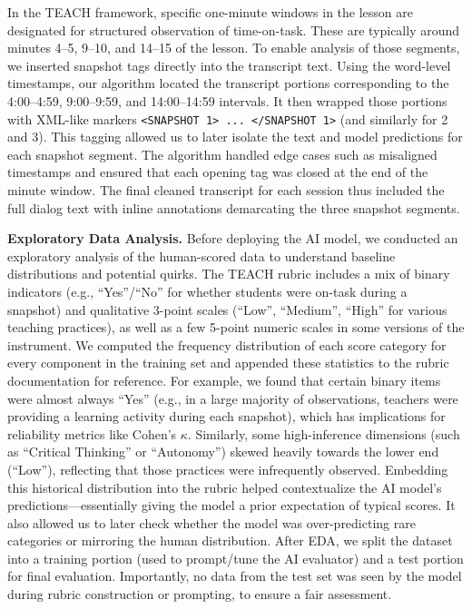 \documentclass[12pt]{article}
\begin{document}
In the TEACH framework, specific one-minute windows in the lesson are designated for structured observation of time-on-task. These are typically around minutes 4–5, 9–10, and 14–15 of the lesson. To enable analysis of those segments, we inserted snapshot tags directly into the transcript text. Using the word-level timestamps, our algorithm located the transcript portions corresponding to the 4:00–4:59, 9:00–9:59, and 14:00–14:59 intervals. It then wrapped those portions with XML-like markers \verb|<SNAPSHOT 1> ... </SNAPSHOT 1>| (and similarly for 2 and 3). This tagging allowed us to later isolate the text and model predictions for each snapshot segment. The algorithm handled edge cases such as misaligned timestamps and ensured that each opening tag was closed at the end of the minute window. The final cleaned transcript for each session thus included the full dialog text with inline annotations demarcating the three snapshot segments.

\textbf{Exploratory Data Analysis.} Before deploying the AI model, we conducted an exploratory analysis of the human-scored data to understand baseline distributions and potential quirks. The TEACH rubric includes a mix of binary indicators (e.g., “Yes”/“No” for whether students were on-task during a snapshot) and qualitative 3-point scales (“Low”, “Medium”, “High” for various teaching practices), as well as a few 5-point numeric scales in some versions of the instrument. We computed the frequency distribution of each score category for every component in the training set and appended these statistics to the rubric documentation for reference. For example, we found that certain binary items were almost always “Yes” (e.g., in a large majority of observations, teachers were providing a learning activity during each snapshot), which has implications for reliability metrics like Cohen’s \(\kappa\). Similarly, some high-inference dimensions (such as “Critical Thinking” or “Autonomy”) skewed heavily towards the lower end (“Low”), reflecting that those practices were infrequently observed. Embedding this historical distribution into the rubric helped contextualize the AI model’s predictions—essentially giving the model a prior expectation of typical scores. It also allowed us to later check whether the model was over-predicting rare categories or mirroring the human distribution. After EDA, we split the dataset into a training portion (used to prompt/tune the AI evaluator) and a test portion for final evaluation. Importantly, no data from the test set was seen by the model during rubric construction or prompting, to ensure a fair assessment.
\end{document}
